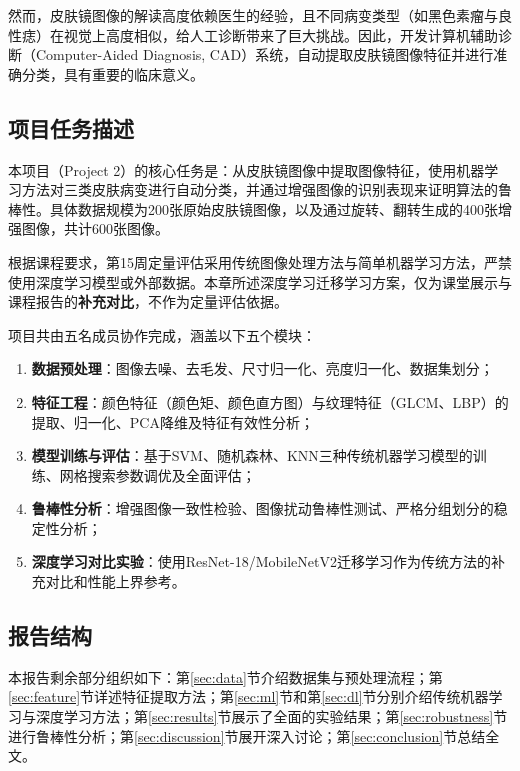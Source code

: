 \documentclass[UTF8,a4paper,12pt]{ctexart}
\numberwithin{figure}{section}
\numberwithin{table}{section}
\begin{document}
然而，皮肤镜图像的解读高度依赖医生的经验，且不同病变类型（如黑色素瘤与良性痣）在视觉上高度相似，给人工诊断带来了巨大挑战。因此，开发计算机辅助诊断（Computer-Aided Diagnosis, CAD）系统，自动提取皮肤镜图像特征并进行准确分类，具有重要的临床意义。

\subsection{项目任务描述}

本项目（Project 2）的核心任务是：从皮肤镜图像中提取图像特征，使用机器学习方法对三类皮肤病变进行自动分类，并通过增强图像的识别表现来证明算法的鲁棒性。具体数据规模为200张原始皮肤镜图像，以及通过旋转、翻转生成的400张增强图像，共计600张图像。

根据课程要求，第15周定量评估采用传统图像处理方法与简单机器学习方法，严禁使用深度学习模型或外部数据。本章所述深度学习迁移学习方案，仅为课堂展示与课程报告的\textbf{补充对比}，不作为定量评估依据。

项目共由五名成员协作完成，涵盖以下五个模块：
\begin{enumerate}
    \item \textbf{数据预处理}：图像去噪、去毛发、尺寸归一化、亮度归一化、数据集划分；
    \item \textbf{特征工程}：颜色特征（颜色矩、颜色直方图）与纹理特征（GLCM、LBP）的提取、归一化、PCA降维及特征有效性分析；
    \item \textbf{模型训练与评估}：基于SVM、随机森林、KNN三种传统机器学习模型的训练、网格搜索参数调优及全面评估；
    \item \textbf{鲁棒性分析}：增强图像一致性检验、图像扰动鲁棒性测试、严格分组划分的稳定性分析；
    \item \textbf{深度学习对比实验}：使用ResNet-18/MobileNetV2迁移学习作为传统方法的补充对比和性能上界参考。
\end{enumerate}

\subsection{报告结构}

本报告剩余部分组织如下：第\ref{sec:data}节介绍数据集与预处理流程；第\ref{sec:feature}节详述特征提取方法；第\ref{sec:ml}节和第\ref{sec:dl}节分别介绍传统机器学习与深度学习方法；第\ref{sec:results}节展示了全面的实验结果；第\ref{sec:robustness}节进行鲁棒性分析；第\ref{sec:discussion}节展开深入讨论；第\ref{sec:conclusion}节总结全文。

\end{document}
